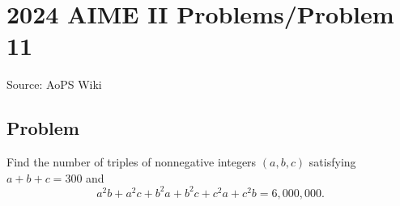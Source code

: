 \documentclass[12pt]{article}
\begin{document}
\section*{{2024 AIME II Problems/Problem 11}}
Source: AoPS Wiki

\subsection*{Problem}
Find the number of triples of nonnegative integers $(a,b,c)$ satisfying $a + b + c = 300$ and \[a^2b + a^2c + b^2a + b^2c + c^2a + c^2b = 6,000,000.\]
\end{document}
